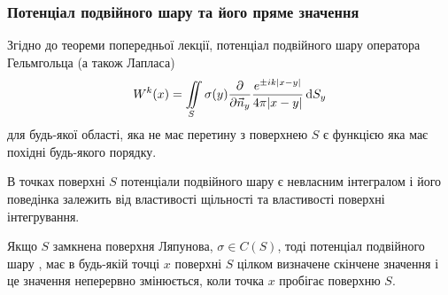 \subsubsection{Потенціал подвійного шару та його пряме значення}

Згідно до теореми  попередньої лекції, потенціал подвійного шару оператора Гельмгольца (а також Лапласа)
\begin{equation}
	W^k(x) = \displaystyle\iint\limits_S \sigma(y) \frac{\partial}{\partial \vec n_y} \frac{e^{\pm i k |x - y|}}{4 \pi |x - y|} \mathop{}\!\mathrm{d} S_y
\end{equation}
для будь-якої області, яка не має перетину з поверхнею $S$ є функцією яка має похідні будь-якого порядку. \medskip

В точках поверхні $S$ потенціали подвійного шару є невласним інтегралом і його поведінка залежить від властивості щільності та властивості поверхні інтегрування.

\begin{theorem}
	Якщо $S$ замкнена поверхня Ляпунова, $\sigma \in C(S)$, тоді потенціал подвійного шару ,  має в будь-якій точці $x$ поверхні $S$ цілком визначене скінчене значення і це значення неперервно змінюється, коли точка $x$ пробігає поверхню $S$.
\end{theorem}

